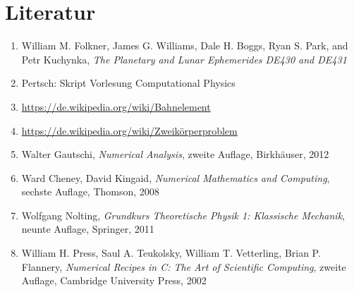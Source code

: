 \section{Literatur} %
\label{sec:literatur}

	\begin{enumerate}[label=(\arabic*)]
		\item
		William M. Folkner, James G. Williams, Dale H. Boggs, Ryan S. Park, and Petr Kuchynka, \textit{The Planetary and Lunar Ephemerides DE430 and DE431}
		\item
		Pertsch: Skript Vorlesung Computational Physics
		\item
		\url{https://de.wikipedia.org/wiki/Bahnelement}
		\item
		\url{https://de.wikipedia.org/wiki/Zweikörperproblem}
		\item
		Walter Gautschi, \textit{Numerical Analysis}, zweite Auflage, Birkhäuser, 2012
		\item
		Ward Cheney, David Kingaid, \textit{Numerical Mathematics and Computing}, sechste Auflage, Thomson, 2008
		\item
		Wolfgang Nolting, \textit{Grundkurs Theoretische Physik 1: Klassische Mechanik}, neunte Auflage, Springer, 2011
		\item
		William H. Press, Saul A. Teukolsky, William T. Vetterling, Brian P. Flannery, \textit{Numerical Recipes in C: The Art of Scientific Computing}, zweite Auflage, Cambridge University Press, 2002
	\end{enumerate}

